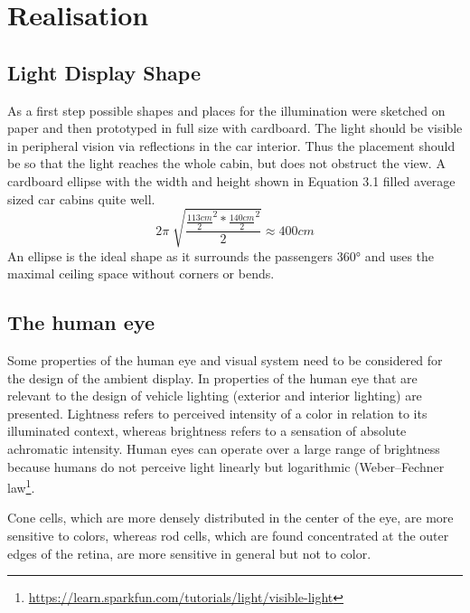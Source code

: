 \chapter{Realisation}

\section{Light Display Shape}
\label{LEDshape}
As a first step possible shapes and places for the illumination were sketched on paper and then prototyped in full size with cardboard. The light should be visible in peripheral vision via reflections in the car interior. Thus the placement should be so that the light reaches the whole cabin, but does not obstruct the view. A cardboard ellipse with the width and height shown in Equation 3.1 filled average sized car cabins quite well. 
\begin{equation}2\pi \sqrt[]{\frac{\frac{113 cm}{2}^2 * \frac{140 cm}{2}^2}{2}}\approx 400cm \end{equation}
An ellipse is the ideal shape as it surrounds the passengers 360° and uses the maximal ceiling space without corners or bends.

\section{The human eye}
\label{sec:eye}
Some properties of the human eye and visual system need to be considered for the design of the ambient display. In \cite{Wordenweber2007AutomotiveVision} properties of the human eye that are relevant to the design of vehicle lighting (exterior and interior lighting) are presented. 
Lightness refers to perceived intensity of a color in relation to its illuminated context, whereas brightness refers to a sensation of absolute achromatic intensity\cite{Brill2014DoesQuestion}. Human eyes can operate over a large range of brightness because humans do not perceive light linearly but logarithmic (Weber–Fechner law\footnote{\url{https://learn.sparkfun.com/tutorials/light/visible-light}}.

Cone cells, which are more densely distributed in the center of the eye, are more sensitive to colors, whereas rod cells, which are found concentrated at the outer edges of the retina, are more sensitive in general but not to color.

